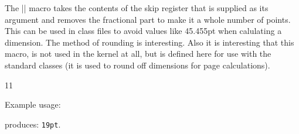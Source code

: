 The |\@settopoint| macro takes the contents of the skip register that is supplied as its argument
and removes the fractional part to make it a whole number of points. This can be
used in class files to avoid values like 45.455pt when calulating a dimension. The method of
rounding is interesting. Also it is interesting that this macro, is not used in the kernel at all, but is defined
here for use with the standard classes (it is used to round off dimensions for page calculations).

\medskip
\begin{Code}
11 \def\@settopoint#1{\divide#1\p@\multiply#1\p@}
\end{Code}
\medskip

Example usage:
\medskip

\begin{Code}
\makeatletter
\newlength\test
\setlength\test{19.5pt}
\@settopoint{\test}

\the\test
\makeatother
\end{Code}

produces: \texttt{19pt}.
